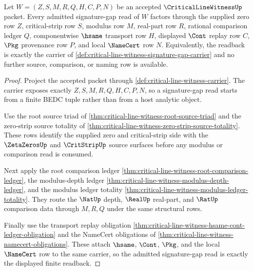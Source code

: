 \begin{theorem}
\label{thm:critical-line-witness-signature-gap-exactness}
Let $W=(Z,S,M,R,Q,H,C,P,N)$ be an accepted $\CriticalLineWitnessUp$ packet. Every admitted signature-gap read of $W$ factors through the supplied zero row $Z$, critical-strip row $S$, modulus row $M$, real-part row $R$, rational comparison ledger $Q$, componentwise $\hsame$ transport row $H$, displayed $\Cont$ replay row $C$, $\Pkg$ provenance row $P$, and local $\NameCert$ row $N$. Equivalently, the readback is exactly the carrier of \autoref{def:critical-line-witness-signature-gap-carrier} and no further source, comparison, or naming row is available.
\end{theorem}
\begin{proof}
Project the accepted packet through \autoref{def:critical-line-witness-carrier}. The carrier exposes exactly $Z,S,M,R,Q,H,C,P,N$, so a signature-gap read starts from a finite BEDC tuple rather than from a host analytic object.

Use the root source triad of \autoref{thm:critical-line-witness-root-source-triad} and the zero-strip source totality of \autoref{thm:critical-line-witness-zero-strip-source-totality}. These rows identify the supplied zero and critical-strip side with the $\ZetaZerosUp$ and $\CritStripUp$ source surfaces before any modulus or comparison read is consumed.

Next apply the root comparison ledger \autoref{thm:critical-line-witness-root-comparison-ledger}, the modulus-depth ledger \autoref{thm:critical-line-witness-modulus-depth-ledger}, and the modulus ledger totality \autoref{thm:critical-line-witness-modulus-ledger-totality}. They route the $\NatUp$ depth, $\RealUp$ real-part, and $\RatUp$ comparison data through $M,R,Q$ under the same structural rows.

Finally use the transport replay obligation \autoref{thm:critical-line-witness-hsame-cont-ledger-obligation} and the NameCert obligations of \autoref{thm:critical-line-witness-namecert-obligations}. These attach $\hsame$, $\Cont$, $\Pkg$, and the local $\NameCert$ row to the same carrier, so the admitted signature-gap read is exactly the displayed finite readback.
\end{proof}

